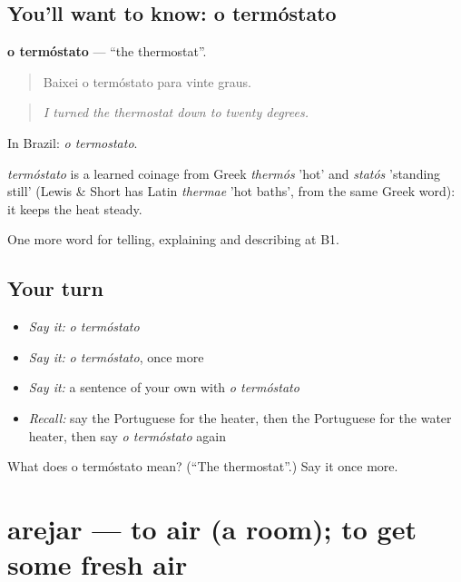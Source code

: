 \subsection*{You'll want to know: o termóstato}
\textbf{o termóstato} — \textquotedblleft{}the thermostat\textquotedblright{}.

\begin{quote}
Baixei o termóstato para vinte graus.
\end{quote}

\begin{quote}
\emph{I turned the thermostat down to twenty degrees.}
\end{quote}

In Brazil: \emph{o termostato}.

\begin{cousinweb}
\emph{termóstato} is a learned coinage from Greek \emph{thermós} 'hot' and \emph{statós} 'standing still' (Lewis \& Short has Latin \emph{thermae} 'hot baths', from the same Greek word): it keeps the heat steady.
\end{cousinweb}

\begin{grammarlens}[title={What you've built}]
One more word for telling, explaining and describing at B1.
\end{grammarlens}

\subsection*{Your turn}
\begin{itemize}
\raggedright
  \item \emph{Say it:} \emph{o termóstato}
  \item \emph{Say it:} \emph{o termóstato}, once more
  \item \emph{Say it:} a sentence of your own with \emph{o termóstato}
  \item \emph{Recall:} say the Portuguese for the heater, then the Portuguese for the water heater, then say \emph{o termóstato} again
\end{itemize}

\begin{tcolorbox}[breakable,colback=teal!4,colframe=teal!35!black,title={Before you move on}]
What does o termóstato mean? (\textquotedblleft{}The thermostat\textquotedblright{}.) Say it once more.
\end{tcolorbox}
\section[arejar]{arejar — to air (a room); to get some fresh air}

